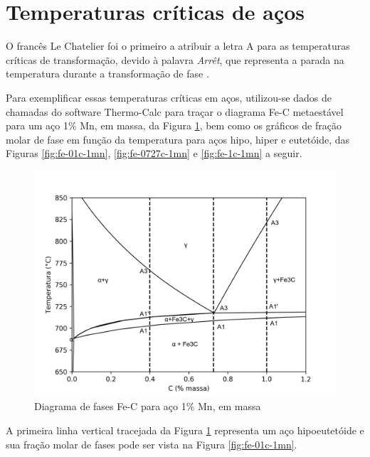 \documentclass[brazil,tese,epusp]{usp}
\begin{document}
\section{Temperaturas cr\'iticas de aços}
O francês Le Chatelier foi o primeiro a atribuir a letra A para as temperaturas críticas de transformação, devido à palavra \textit{Arrêt}, que representa a parada na temperatura durante a transformação de fase \cite{Silva2010}.

Para exemplificar essas temperaturas críticas em aços, utilizou-se dados de chamadas do software Thermo-Calc\textregistered{} para traçar o diagrama Fe-C metaestável para um aço 1\% Mn, em massa, da Figura \ref{fig:fe-1mn-C_isopleth}, bem como os gráficos de fração molar de fase em função da temperatura para aços hipo, hiper e eutetóide, das Figuras \ref{fig:fe-01c-1mn}, \ref{fig:fe-0727c-1mn} e \ref{fig:fe-1c-1mn} a seguir.

\begin{figure}[ht!]
  \includegraphics[width=.9\textwidth]{img/Fe-1Mn-C_isopleth_edited.png}
  \caption{Diagrama de fases Fe-C para aço 1\% Mn, em massa}
  \label{fig:fe-1mn-C_isopleth}
\end{figure}

A primeira linha vertical tracejada da Figura \ref{fig:fe-1mn-C_isopleth} representa um aço hipoeutetóide e sua fração molar de fases pode ser vista na Figura \ref{fig:fe-01c-1mn}.
\end{document}
